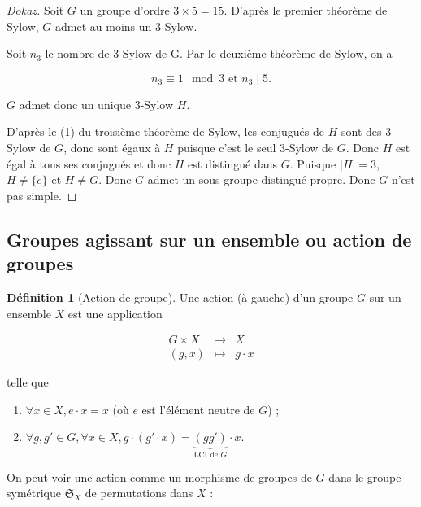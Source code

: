 \documentclass[french]{book}
\theoremstyle{definition}
\newtheorem{protodefinition}{Définition}[section]
\newenvironment{definition}
    {\colorlet{shadecolor}{green!5}\begin{shaded}\begin{protodefinition}}
    {\end{protodefinition}\end{shaded}}
\begin{document}
\begin{proof}[Dokaz]
  Soit $G$ un groupe d'ordre $3 \times 5 = 15$. D'après le premier théorème de Sylow, $G$ admet au moins un 3-Sylow.

  Soit $n_3$ le nombre de 3-Sylow de G. Par le deuxième théorème de Sylow, on a

  \[
  n_3 \equiv 1 \mod 3 \text{ et } n_3 \mid 5.
  \]

  $G$ admet donc un unique 3-Sylow $H$.

  D'après le (1) du troisième théorème de Sylow, les conjugués de $H$ sont des 3-Sylow de $G$, donc sont égaux à $H$ puisque c'est le seul 3-Sylow de $G$. Donc $H$ est égal à tous ses conjugués et donc $H$ est distingué dans $G$. Puisque $\lvert H \rvert = 3$, $H \neq \{ e \} $ et $H \neq G$. Donc $G$ admet un sous-groupe distingué propre. Donc $G$ n'est pas simple.
\end{proof}

\subsection{Groupes agissant sur un ensemble ou action de groupes}

\begin{definition}[Action de groupe]
  Une action (à gauche) d'un groupe $G$ sur un ensemble $X$ est une application

  \[
  \begin{matrix}
  G  \times X& \longrightarrow & X \\
  (g,x) & \longmapsto & g \cdot x
  \end{matrix}
  \]

  telle que

  \begin{enumerate}
    \item $\forall x \in X, e \cdot x = x$ (où $e$ est l'élément neutre de $G$) ;
    \item $\forall g, g' \in G, \forall x \in X, g \cdot (g' \cdot x) = \underbrace{(gg')}_{\text{LCI de } G}\cdot x$.
  \end{enumerate}
\end{definition}

On peut voir une action comme un morphisme de groupes de $G$ dans le groupe symétrique $\mathfrak{S}_{X} $ de permutations dans $X$ :
\end{document}
